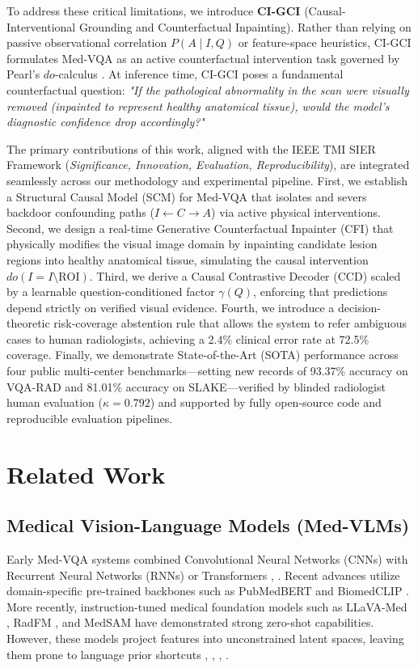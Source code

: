 \documentclass[journal,twoside,web]{ieeecolor}
\begin{document}
To address these critical limitations, we introduce \textbf{CI-GCI} (Causal-Interventional Grounding and Counterfactual Inpainting). Rather than relying on passive observational correlation $P(A \mid I, Q)$ or feature-space heuristics, CI-GCI formulates Med-VQA as an active counterfactual intervention task governed by Pearl's $do$-calculus \cite{pearl2009}. At inference time, CI-GCI poses a fundamental counterfactual question: \emph{"If the pathological abnormality in the scan were visually removed (inpainted to represent healthy anatomical tissue), would the model's diagnostic confidence drop accordingly?"}

The primary contributions of this work, aligned with the IEEE TMI SIER Framework (\emph{Significance, Innovation, Evaluation, Reproducibility}), are integrated seamlessly across our methodology and experimental pipeline. First, we establish a Structural Causal Model (SCM) for Med-VQA that isolates and severs backdoor confounding paths ($I \leftarrow C \rightarrow A$) via active physical interventions. Second, we design a real-time Generative Counterfactual Inpainter (CFI) that physically modifies the visual image domain by inpainting candidate lesion regions into healthy anatomical tissue, simulating the causal intervention $do(I = I \setminus \text{ROI})$. Third, we derive a Causal Contrastive Decoder (CCD) scaled by a learnable question-conditioned factor $\gamma(Q)$, enforcing that predictions depend strictly on verified visual evidence. Fourth, we introduce a decision-theoretic risk-coverage abstention rule that allows the system to refer ambiguous cases to human radiologists, achieving a 2.4\% clinical error rate at 72.5\% coverage. Finally, we demonstrate State-of-the-Art (SOTA) performance across four public multi-center benchmarks---setting new records of 93.37\% accuracy on VQA-RAD and 81.01\% accuracy on SLAKE---verified by blinded radiologist human evaluation ($\kappa = 0.792$) and supported by fully open-source code and reproducible evaluation pipelines.

\section{Related Work}
\label{sec:related}
\subsection{Medical Vision-Language Models (Med-VLMs)}
Early Med-VQA systems combined Convolutional Neural Networks (CNNs) with Recurrent Neural Networks (RNNs) or Transformers \cite{nguyen2019}, \cite{lili2022}. Recent advances utilize domain-specific pre-trained backbones such as PubMedBERT \cite{gu2021} and BiomedCLIP \cite{zhang2023}. More recently, instruction-tuned medical foundation models such as LLaVA-Med \cite{liu2023llavamed}, RadFM \cite{wu2024radfm}, and MedSAM \cite{ma2024medsam} have demonstrated strong zero-shot capabilities. However, these models project features into unconstrained latent spaces, leaving them prone to language prior shortcuts \cite{yan2024tokenmixer}, \cite{wang2024chatcadplus}, \cite{chen2025mimo}, \cite{li2025mvcm}.
\end{document}

